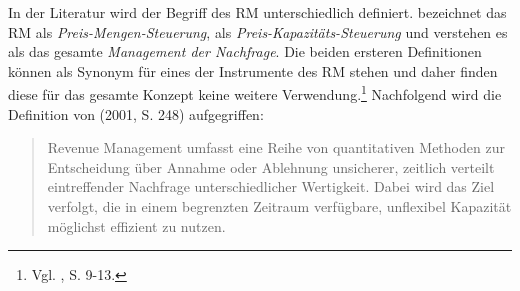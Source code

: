 
In der Literatur wird der Begriff des RM unterschiedlich definiert. \cite{friege1996yield} bezeichnet das RM als \textit{Preis-Mengen-Steuerung}, \cite{daudel1992yield} als \textit{Preis-Kapazitäts-Steuerung} und \cite{talluri2004theory} verstehen es als das gesamte \textit{Management der Nachfrage}. Die beiden ersteren Definitionen können als Synonym für eines der Instrumente des RM stehen und daher finden diese für das gesamte Konzept keine weitere Verwendung.\footnote{Vgl. \cite{Petrick:2009aa}, S. 9-13.} Nachfolgend wird die Definition von \citeauthor{klein2001revenue} (2001, S. 248) aufgegriffen:

\begin{quote}
\glqq Revenue Management umfasst eine Reihe von quantitativen Methoden zur Entscheidung über Annahme oder Ablehnung unsicherer, zeitlich verteilt eintreffender Nachfrage unterschiedlicher Wertigkeit. Dabei wird das Ziel verfolgt, die in einem begrenzten Zeitraum verfügbare, unflexibel Kapazität möglichst effizient zu nutzen.\grqq
\end{quote}

